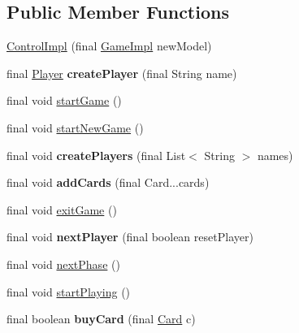 \subsection*{\-Public \-Member \-Functions}
\begin{DoxyCompactItemize}
\item 
\hyperlink{classdominion_1_1control_1_1ControlImpl_affd93ebda1f495303df07fc986f47cf5}{\-Control\-Impl} (final \hyperlink{classdominion_1_1model_1_1GameImpl}{\-Game\-Impl} new\-Model)
\item 
\hypertarget{classdominion_1_1control_1_1ControlImpl_a9f0c8d2c12c0643525c8be59bed170b4}{final \hyperlink{interfacedominion_1_1model_1_1Player}{\-Player} {\bfseries create\-Player} (final \-String name)}\label{classdominion_1_1control_1_1ControlImpl_a9f0c8d2c12c0643525c8be59bed170b4}

\item 
final void \hyperlink{classdominion_1_1control_1_1ControlImpl_aca20e5798f9ff538cdab05d4f7db902f}{start\-Game} ()
\item 
final void \hyperlink{classdominion_1_1control_1_1ControlImpl_aa22233635bdcbce49a8480c1848dbb62}{start\-New\-Game} ()
\item 
\hypertarget{classdominion_1_1control_1_1ControlImpl_a111054ce8c6582224303d67c5d199e56}{final void {\bfseries create\-Players} (final \-List$<$ \-String $>$ names)}\label{classdominion_1_1control_1_1ControlImpl_a111054ce8c6582224303d67c5d199e56}

\item 
\hypertarget{classdominion_1_1control_1_1ControlImpl_aa19e3e943b7ddca3cc9ccf5d04077656}{final void {\bfseries add\-Cards} (final \-Card...\-cards)}\label{classdominion_1_1control_1_1ControlImpl_aa19e3e943b7ddca3cc9ccf5d04077656}

\item 
final void \hyperlink{classdominion_1_1control_1_1ControlImpl_a7bd53f8952dac44a2584e7f8cd3f1034}{exit\-Game} ()
\item 
\hypertarget{classdominion_1_1control_1_1ControlImpl_a0b872db1f1d36ab8e1e9db894162318c}{final void {\bfseries next\-Player} (final boolean reset\-Player)}\label{classdominion_1_1control_1_1ControlImpl_a0b872db1f1d36ab8e1e9db894162318c}

\item 
final void \hyperlink{classdominion_1_1control_1_1ControlImpl_a925fe1cb6ade0a4aa37153a1f07b3dd3}{next\-Phase} ()
\item 
final void \hyperlink{classdominion_1_1control_1_1ControlImpl_aa8f593b871a78d5899195ba01dfe0f76}{start\-Playing} ()
\item 
\hypertarget{classdominion_1_1control_1_1ControlImpl_a933495931c5edf5b30acd461f389e65c}{final boolean {\bfseries buy\-Card} (final \hyperlink{interfacedominion_1_1model_1_1cards_1_1Card}{\-Card} c)}\label{classdominion_1_1control_1_1ControlImpl_a933495931c5edf5b30acd461f389e65c}

\end{DoxyCompactItemize}


